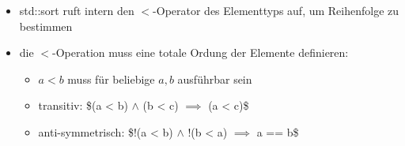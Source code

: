 \documentclass[a4paper]{scrartcl}
\theoremstyle{definition}
\theoremstyle{plain}
\theoremstyle{remark}
\theoremstyle{remark}
\begin{document}
\begin{itemize}
\begin{itemize}
\begin{itemize}
\item std::sort ruft intern den $<$-Operator des Elementtyps auf, um Reihenfolge zu bestimmen
\item die $<$-Operation muss eine totale Ordung der Elemente definieren:
\begin{itemize}
\item $a < b$ muss für beliebige $a,b$ ausführbar sein
\item transitiv: \$(a < b) $\wedge$ (b < c) $\implies$ (a < c)\$
\item anti-symmetrisch: \$!(a < b) $\wedge$ !(b < a) $\implies$ a == b\$
\end{itemize}
\end{itemize}
\end{itemize}
\end{itemize}
\end{document}
